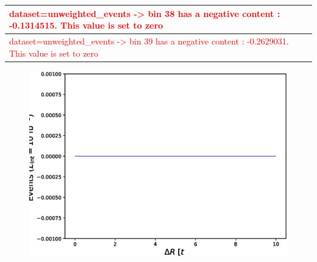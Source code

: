 \documentclass[a4paper, 10pt]{article}
\begin{document}
\begin{table}[H]
\begin{center}
\begin{tabular}{|m{140.0mm}|}
      \hline
      {\cellcolor{white}\textcolor{red}{dataset=unweighted\_events -> bin 38 has a negative content : -0.1314515. This value is set to zero}}\\
      \hline
      {\cellcolor{white}\textcolor{red}{dataset=unweighted\_events -> bin 39 has a negative content : -0.2629031. This value is set to zero}}\\
      \hline
\hline
    \end{tabular}
  \end{center}
\end{table}

\begin{figure}[H]
  \begin{center}
    \includegraphics[scale=0.45]{selection_8.eps}\\
\caption{   }
  \end{center}
\end{figure}
      
\end{document}
